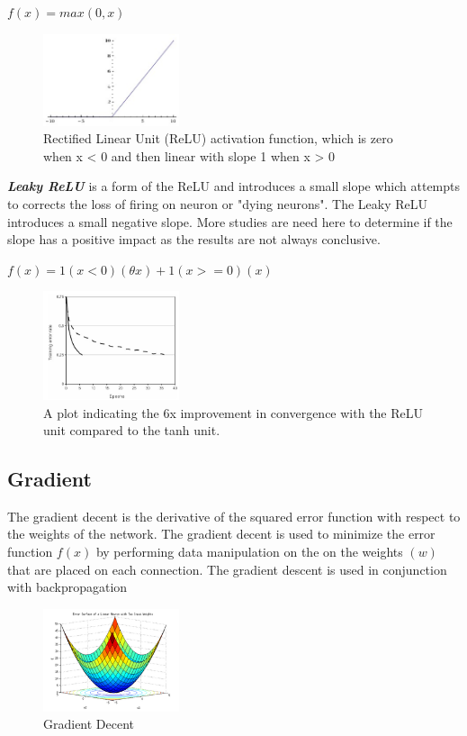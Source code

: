 \documentclass[journal]{IEEEtran}
\begin{document}
\begin{center}
$f(x) = max(0,x)$
\end{center}

\hfill\break
\begin{figure}[h]
    \centering
    \includegraphics[width=4cm]{relu}
    \caption{Rectified Linear Unit (ReLU) activation function, which is zero when x < 0 and then linear with slope 1 when x > 0}
\end{figure}

\textbf{\textit{Leaky ReLU}} is a form of the ReLU and introduces a small slope which attempts to corrects the loss of firing on neuron or "dying neurons".  The Leaky ReLU introduces a small negative slope.  More studies are need here to determine if the slope has a positive impact as the results are not always conclusive.
\hfill\break
\begin{center}
$f(x) = 1(x<0)(\theta x) + 1(x >= 0)(x)$
\end{center}

\hfill\break
\begin{figure}[h]
    \centering
    \includegraphics[width=4cm]{leakyrelu}
    \caption{A plot \cite{imageClassification} indicating the 6x improvement in convergence with the ReLU unit compared to the tanh unit.}
\end{figure}

\subsection{Gradient}
The gradient decent is the derivative of the squared error function with respect to the weights of the network.  The gradient decent is used to minimize the error function $f(x)$ by performing data manipulation on the on the weights $(w)$ that are placed on each connection.  The gradient descent is used in conjunction with backpropagation
\begin{figure}[h]
    \centering
    \includegraphics[width=4cm]{gradient}
    \caption{Gradient Decent}
\end{figure}
\end{document}
